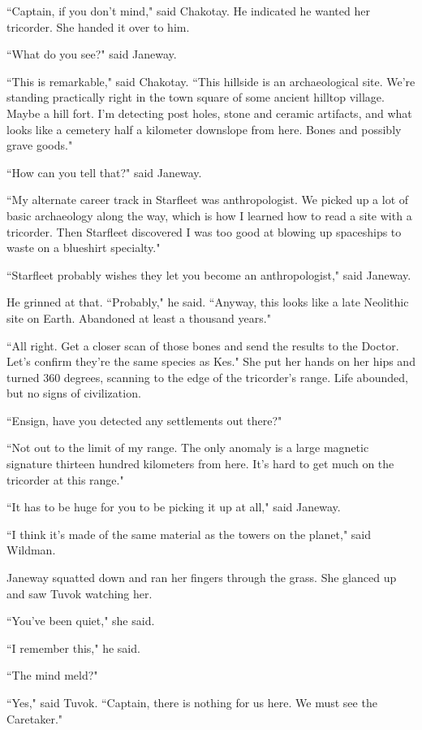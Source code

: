 \documentclass[twoside,letterpaper,12pt]{memoir}
\begin{document}
``Captain, if you don't mind," said Chakotay. He indicated he wanted her tricorder. She handed it over to him. 

``What do you see?" said Janeway. 

``This is remarkable," said Chakotay. ``This hillside is an archaeological site. We're standing practically right in the town square of some ancient hilltop village. Maybe a hill fort. I'm detecting post holes, stone and ceramic artifacts, and what looks like a cemetery half a kilometer downslope from here. Bones and possibly grave goods." 

``How can you tell that?" said Janeway. 

``My alternate career track in Starfleet was anthropologist. We picked up a lot of basic archaeology along the way, which is how I learned how to read a site with a tricorder. Then Starfleet discovered I was too good at blowing up spaceships to waste on a blueshirt specialty." 

``Starfleet probably wishes they let you become an anthropologist," said Janeway. 

He grinned at that. ``Probably," he said. ``Anyway, this looks like a late Neolithic site on Earth. Abandoned at least a thousand years." 

``All right. Get a closer scan of those bones and send the results to the Doctor. Let's confirm they're the same species as Kes." She put her hands on her hips and turned 360 degrees, scanning to the edge of the tricorder’s range. Life abounded, but no signs of civilization. 

``Ensign, have you detected any settlements out there?" 

``Not out to the limit of my range. The only anomaly is a large magnetic signature thirteen hundred kilometers from here. It's hard to get much on the tricorder at this range." 

``It has to be huge for you to be picking it up at all," said Janeway. 

``I think it's made of the same material as the towers on the planet," said Wildman. 

Janeway squatted down and ran her fingers through the grass. She glanced up and saw Tuvok watching her. 

``You’ve been quiet," she said. 

``I remember this," he said. 

``The mind meld?" 

``Yes," said Tuvok. ``Captain, there is nothing for us here. We must see the Caretaker." 
\end{document}
